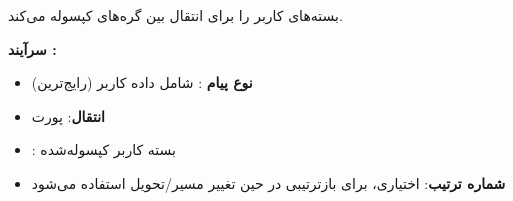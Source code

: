 

 بسته‌های  کاربر را برای انتقال بین گره‌های  کپسوله می‌کند.

\textbf{سرآیند :}


\begin{itemize}
\tightlist
\item
  \textbf{نوع پیام }:   شامل داده کاربر (رایج‌ترین)
\item
  \textbf{انتقال}: پورت 
\item
  : بسته  کاربر کپسوله‌شده
\item
  \textbf{شماره ترتیب}: اختیاری، برای بازترتیبی در حین تغییر مسیر/\allowbreak{}تحویل استفاده می‌شود
\end{itemize}




